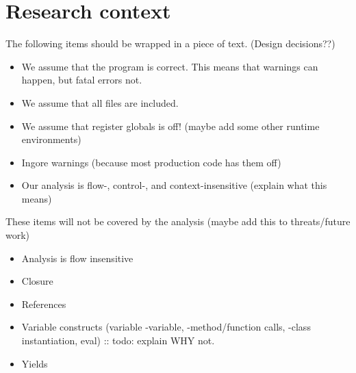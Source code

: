 \documentclass[../main.tex]{subfiles}
\begin{document}
    \section{Research context}
    The following items should be wrapped in a piece of text. (Design decisions??)
    \begin{itemize}
        \item We assume that the program is correct. This means that warnings can happen, but fatal errors not.
        \item We assume that all files are included.
        \item We assume that register globals is off! (maybe add some other runtime environments)
        \item Ingore warnings (because most production code has them off)
        \item Our analysis is flow-, control-, and context-insensitive (explain what this means)
    \end{itemize}
    These items will not be covered by the analysis (maybe add this to threats/future work)
    \begin{itemize}
        \item Analysis is flow insensitive
        \item Closure
        \item References
        \item Variable constructs (variable -variable, -method/function calls, -class instantiation, eval) :: todo: explain WHY not.
        \item Yields
    \end{itemize}
\end{document}
